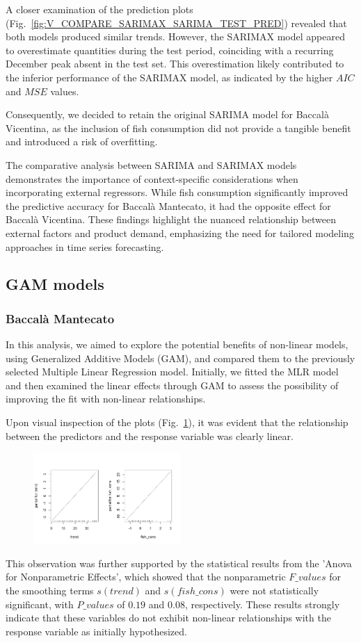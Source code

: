 \documentclass[10pt,twocolumn,letterpaper]{article}
\begin{document}
A closer examination of the prediction plots (Fig.~\ref{fig:V_COMPARE_SARIMAX_SARIMA_TEST_PRED}) revealed that both models produced similar trends. However, the SARIMAX model appeared to overestimate quantities during the test period, coinciding with a recurring December peak absent in the test set. This overestimation likely contributed to the inferior performance of the SARIMAX model, as indicated by the higher $AIC$ and $MSE$ values.

Consequently, we decided to retain the original SARIMA model for Baccalà Vicentina, as the inclusion of fish consumption did not provide a tangible benefit and introduced a risk of overfitting.

The comparative analysis between SARIMA and SARIMAX models demonstrates the importance of context-specific considerations when incorporating external regressors. While fish consumption significantly improved the predictive accuracy for Baccalà Mantecato, it had the opposite effect for Baccalà Vicentina. These findings highlight the nuanced relationship between external factors and product demand, emphasizing the need for tailored modeling approaches in time series forecasting.

\subsection{GAM models}
\subsubsection{Baccalà Mantecato}
In this analysis, we aimed to explore the potential benefits of non-linear models, using Generalized Additive Models (GAM), and compared them to the previously selected Multiple Linear Regression model. Initially, we fitted the MLR model and then examined the linear effects through GAM to assess the possibility of improving the fit with non-linear relationships.

Upon visual inspection of the plots (Fig.~\ref{fig:GAM_M_LINEARITY}), it was evident that the relationship between the predictors and the response variable was clearly linear. 
\begin{figure}[H]
    \centering
    \includegraphics[width=0.5\textwidth]{PlotsBEFD/GAM_M_LINEARITY.png} 
    \caption{}
    \label{fig:GAM_M_LINEARITY}
\end{figure}
This observation was further supported by the statistical results from the 'Anova for Nonparametric Effects', which showed that the nonparametric $F\_values$ for the smoothing terms $s(trend)$ and $s(fish\_cons)$ were not statistically significant, with $P\_values$ of $0.19$ and $0.08$, respectively.
These results strongly indicate that these variables do not exhibit non-linear relationships with the response variable as initially hypothesized.
\end{document}
